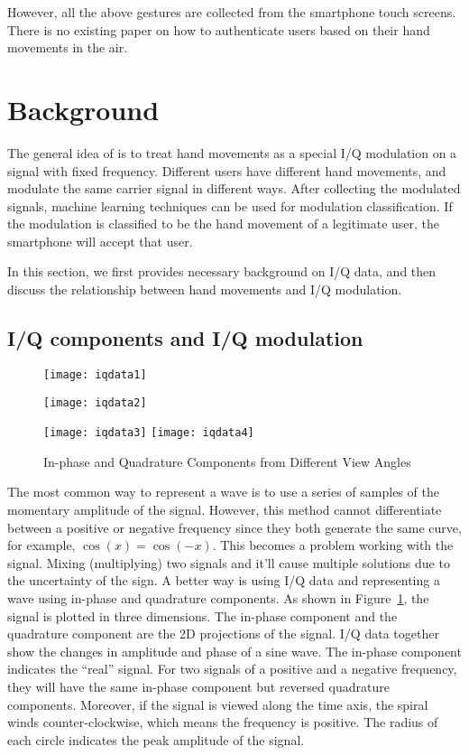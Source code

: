 However, all the above gestures are collected from the smartphone touch screens. There is no existing paper on how to authenticate users based on their hand movements in the air.

\section{Background}\label{sec:handIQ}
The general idea of {\uu} is to treat hand movements as a special I/Q modulation on a signal with fixed frequency. Different users have different hand movements, and modulate the same carrier signal in different ways. After collecting the modulated signals, machine learning techniques can be used for modulation classification. If the modulation is classified to be the hand movement of a legitimate user, the smartphone will accept that user. 

In this section, we first provides necessary background on I/Q data, and then discuss the relationship between hand movements and I/Q modulation.

\subsection{I/Q components and I/Q modulation}
\begin{figure}[!h]
	\centering
	\texttt{[image: iqdata1]}
	\begin{minipage}{.4\linewidth}
		\texttt{[image: iqdata2]}
	\end{minipage}
	\hfil
	\begin{minipage}{.5\linewidth}
		\texttt{[image: iqdata3]}
		\texttt{[image: iqdata4]}
	\end{minipage}
	\caption{In-phase and Quadrature Components from Different View Angles}
	\label{fig:iqdata}
\end{figure}

The most common way to represent a wave is to use a series of samples of the momentary amplitude of the signal. However, this method cannot differentiate between a positive or negative frequency since they both generate the same curve, for example,  $\cos(x) = \cos(-x)$. This becomes a problem working with the signal. Mixing (multiplying) two signals and it'll cause multiple solutions due to the uncertainty of the sign. A better way is using I/Q data and representing a wave using in-phase and quadrature components. As shown in Figure~\ref{fig:iqdata}, the signal is plotted in three dimensions. The in-phase component and the quadrature component are the 2D projections of the signal. I/Q data together show the changes in amplitude and phase of a sine wave. The in-phase component indicates the ``real'' signal. For two signals of a positive and a negative frequency, they will have the same in-phase component but reversed quadrature components. Moreover, if the signal is viewed along the time axis, the spiral winds counter-clockwise, which means the frequency is positive. The radius of each circle indicates the peak amplitude of the signal.

